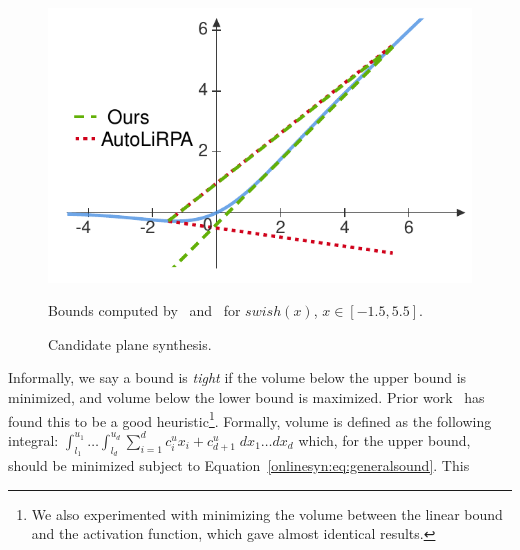 \begin{figure}[t]%
	\centering
	\begin{minipage}{0.48\textwidth}
		\includegraphics[width=0.9\linewidth]{onlinesyn/figs/ours_vs_autolirpa2.pdf}
		\caption{Bounds computed by~\Name{} and~\autolipra{} for $ swish(x)$, $
			x \in [-1.5, 5.5] $.\label{onlinesyn:fig:boundcompare2}}
	\end{minipage}%
	\begin{minipage}{0.48\textwidth}
		\centering
		\scalebox{1.0}{
			
		}
		\caption{Candidate plane synthesis.\label{onlinesyn:fig:running_example}}
	\end{minipage}
\end{figure}
Informally, we say a bound is \textit{tight} if the volume below the
upper bound is minimized, and volume below the lower bound is maximized.
%
Prior work~\cite{zhang2018efficient,SinghGPV19,ko2019popqorn} has
found this to be a good heuristic\footnote{We also experimented with minimizing
the volume between the linear bound and the activation function, which gave
almost identical results.}.
%
Formally, volume is defined as the following integral:
$
\int_{l_1}^{u_1} \dots \int_{l_d}^{u_d} \sum_{i=1}^{d}
c^u_ix_i + c^u_{d+1} \; dx_1 \dots dx_d
$
which, for the upper bound, should be minimized subject to
Equation~\ref{onlinesyn:eq:generalsound}. This
